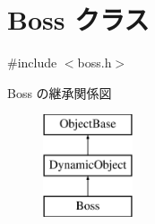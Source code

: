 \hypertarget{class_boss}{}\section{Boss クラス}
\label{class_boss}


{\ttfamily \#include $<$boss.\+h$>$}

Boss の継承関係図\begin{figure}[H]
\begin{center}
\leavevmode
\includegraphics[height=3.000000cm]{class_boss}
\end{center}
\end{figure}
